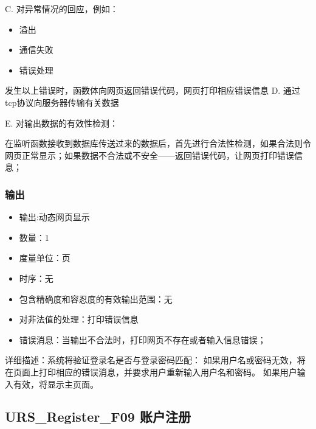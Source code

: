 	  
	  C. 对异常情况的回应，例如：
	  \begin{adjustwidth}{2cm}{1cm}\qquad
		  \begin{itemize}
			  \item 溢出
			  \item 通信失败
			  \item 错误处理
		  \end{itemize}		
	  \end{adjustwidth}
	  
		  发生以上错误时，函数体向网页返回错误代码，网页打印相应错误信息
	  D. 通过tcp协议向服务器传输有关数据
			  
	  E. 对输出数据的有效性检测：
	  
	  在监听函数接收到数据库传送过来的数据后，首先进行合法性检测，如果合法则令网页正常显示；如果数据不合法或不安全——返回错误代码，让网页打印错误信息；
	  
	  \subsubsection{输出}
	  \begin{itemize}
		  \item	输出:动态网页显示
		  \item	数量：1
		  \item	度量单位：页
		  \item	时序：无
		  \item	包含精确度和容忍度的有效输出范围：无
		  \item	对非法值的处理：打印错误信息
		  \item	错误消息：当输出不合法时，打印网页不存在或者输入信息错误；
		 \end{itemize}
		 详细描述：系统将验证登录名是否与登录密码匹配：
		 如果用户名或密码无效，将在页面上打印相应的错误消息，并要求用户重新输入用户名和密码。
		 如果用户输入有效，将显示主页面。






		 \subsection{URS\_Register\_F09 账户注册}

